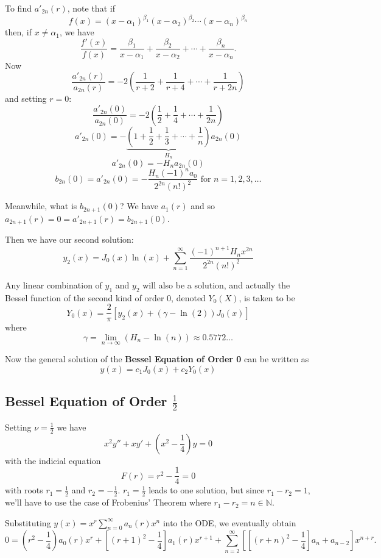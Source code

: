 \documentclass[11pt]{article}
\newcommand{\limseq}{\lim_{n \to \infty}} %
\newcommand{\sumseries}{\sum_{n=0}^{\infty}}
\newcommand{\sumseriesone}{\sum_{n=1}^{\infty}}
\newcommand{\sumseriestwo}{\sum_{n=2}^{\infty}}
\begin{document}
	To find $a'_{2n} (r)$, note that if
		$$ f(x) = (x - \alpha_1)^{\beta_1} (x - \alpha_2)^{\beta_2} \cdots (x - \alpha_n)^{\beta_n} $$
	then, if $x \neq \alpha_1$, we have
		$$ \frac{f'(x)}{f(x)} = \frac{\beta_1}{x - \alpha_1} + \frac{\beta_2}{x - \alpha_2} + \cdots + \frac{\beta_n}{x - \alpha_n}. $$
	Now
		$$ \frac{a'_{2n} (r)}{a_{2n} (r)} = - 2 \left(\frac{1}{r+2} + \frac{1}{r + 4} + \cdots + \frac{1}{r + 2n} \right) $$
	and setting $r = 0$:
		$$ \frac{a'_{2n} (0)}{a_{2n} (0)} = -2 \left( \frac{1}{2} + \frac{1}{4} + \cdots + \frac{1}{2n} \right) $$
		$$ a'_{2n} (0) = - \underbrace{\left(1 + \frac{1}{2} + \frac{1}{3} + \cdots + \frac{1}{n} \right)}_{H_n} a_{2n} (0) $$
		$$ a'_{2n} (0) = - H_n a_{2n} (0) $$
		$$ b_{2n} (0) = a'_{2n} (0) = - \frac{H_n (-1)^n a_0}{2^{2n} (n!)^2} \text{ for } n = 1, 2, 3, \ldots $$

	Meanwhile, what is $b_{2n+1} (0)$? We have $a_1(r)$ and so $a_{2n+1}(r) = 0 = a'_{2n+1}(r) = b_{2n+1} (0)$.

	Then we have our second solution:
		$$ \boxed{y_2 (x) = J_0 (x) \ln (x) + \sumseriesone \frac{(-1)^{n+1} H_n x^{2n}}{2^{2n} (n!)^2}} $$

	Any linear combination of $y_1$ and $y_2$ will also be a solution, and actually the Bessel function of the second kind of order 0, denoted $Y_0 (X)$, is taken to be
		$$ \boxed{Y_0 (x) = \frac{2}{\pi} \left[y_2 (x) + (\gamma - \ln(2)) J_0 (x) \right]} $$
	where
		$$ \gamma = \limseq (H_n - \ln(n)) \approx 0.5772\ldots $$

	Now the general solution of the \textbf{Bessel Equation of Order 0} can be written as
		$$ y(x) = c_1 J_0 (x) + c_2 Y_0 (x) $$

\subsection[Bessel Equation of Order 1/2]{Bessel Equation of Order $\frac{1}{2}$}
	Setting $\nu = \frac{1}{2}$ we have
		$$ x^2 y'' + x y' + \left(x^2 - \frac{1}{4} \right) y = 0 $$
	with the indicial equation
		$$ F(r) = r^2 - \frac{1}{4} = 0 $$
	with roots $r_1 = \frac{1}{2}$ and $r_2 = - \frac{1}{2}$. $r_1 = \frac{1}{2}$ leads to one solution, but since $r_1 - r_2 = 1$, we'll have to use the case of Frobenius' Theorem where $r_1 - r_2 = n \in \mathbb{N}$.

	Substituting $y(x) = x^r \sumseries a_n (r) x^n $ into the ODE, we eventually obtain
		$$ 0 = \left(r^2 - \frac{1}{4}\right) a_0 (r) x^r + \left[(r+1)^2 - \frac{1}{4} \right] a_1 (r) x^{r+1} + \sumseriestwo \left[ \left[ (r+n)^2 - \frac{1}{4} \right] a_n + a_{n-2} \right] x^{n + r} .$$
\end{document}

